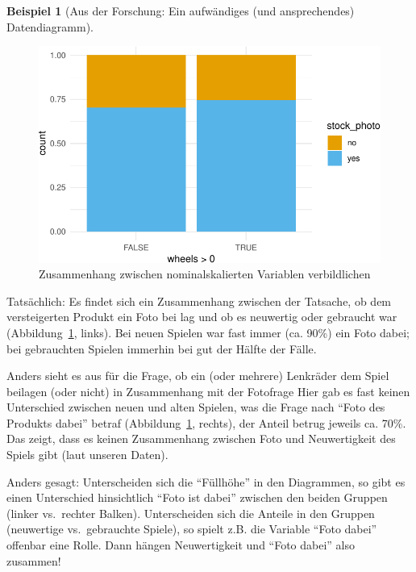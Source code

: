 \documentclass[
  a4paper,
]{scrbook}
\theoremstyle{definition}
\newtheorem{example}{Beispiel}[chapter]
\theoremstyle{definition}
\theoremstyle{definition}
\theoremstyle{remark}
\begin{document}
\begin{example}[Aus der Forschung: Ein aufwändiges (und ansprechendes)
Datendiagramm]
\begin{figure}
\begin{minipage}{0.50\linewidth}
{\includegraphics{040-verbildlichen_files/figure-pdf/fig-zshg-nom1-2.pdf}

}


\end{minipage}%

\caption{\label{fig-zshg-nom1}Zusammenhang zwischen nominalskalierten
Variablen verbildlichen}

\end{figure}%

Tatsächlich: Es findet sich ein Zusammenhang zwischen der Tatsache, ob
dem versteigerten Produkt ein Foto bei lag und ob es neuwertig oder
gebraucht war (Abbildung~\ref{fig-zshg-nom1}, links). Bei neuen Spielen
war fast immer (ca. 90\%) ein Foto dabei; bei gebrauchten Spielen
immerhin bei gut der Hälfte der Fälle.

Anders sieht es aus für die Frage, ob ein (oder mehrere) Lenkräder dem
Spiel beilagen (oder nicht) in Zusammenhang mit der Fotofrage Hier gab
es fast keinen Unterschied zwischen neuen und alten Spielen, was die
Frage nach ``Foto des Produkts dabei'' betraf
(Abbildung~\ref{fig-zshg-nom1}, rechts), der Anteil betrug jeweils ca.
70\%. Das zeigt, dass es keinen Zusammenhang zwischen Foto und
Neuwertigkeit des Spiels gibt (laut unseren Daten).

Anders gesagt: Unterscheiden sich die ``Füllhöhe'' in den Diagrammen, so
gibt es einen Unterschied hinsichtlich ``Foto ist dabei'' zwischen den
beiden Gruppen (linker vs.~rechter Balken). Unterscheiden sich die
Anteile in den Gruppen (neuwertige vs.~gebrauchte Spiele), so spielt
z.B. die Variable ``Foto dabei'' offenbar eine Rolle. Dann hängen
Neuwertigkeit und ``Foto dabei'' also zusammen!


\end{example}
\end{document}
